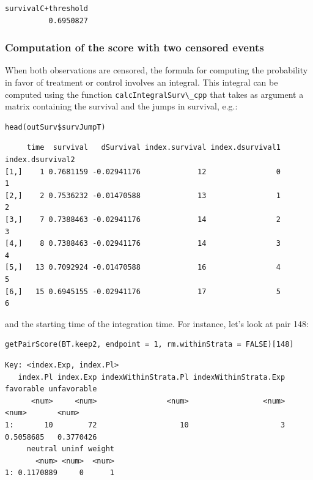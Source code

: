 \documentclass[12pt]{article}
\begin{document}
\begin{verbatim}
survivalC+threshold 
          0.6950827
\end{verbatim}

\subsubsection{Computation of the score with two censored events}
\label{sec:orgd220078}

When both observations are censored, the formula for computing the
probability in favor of treatment or control involves an
integral. This integral can be computed using the function
\texttt{calcIntegralSurv\textbackslash{}\_cpp} that takes as argument a matrix containing the
survival and the jumps in survival, e.g.:
\lstset{language=r,label= ,caption= ,captionpos=b,numbers=none}
\begin{lstlisting}
head(outSurv$survJumpT)
\end{lstlisting}

\begin{verbatim}
     time  survival   dSurvival index.survival index.dsurvival1 index.dsurvival2
[1,]    1 0.7681159 -0.02941176             12                0                1
[2,]    2 0.7536232 -0.01470588             13                1                2
[3,]    7 0.7388463 -0.02941176             14                2                3
[4,]    8 0.7388463 -0.02941176             14                3                4
[5,]   13 0.7092924 -0.01470588             16                4                5
[6,]   15 0.6945155 -0.02941176             17                5                6
\end{verbatim}


and the starting time of the integration time. For instance, let's
look at pair 148:
\lstset{language=r,label= ,caption= ,captionpos=b,numbers=none}
\begin{lstlisting}
getPairScore(BT.keep2, endpoint = 1, rm.withinStrata = FALSE)[148]
\end{lstlisting}

\begin{verbatim}
Key: <index.Exp, index.Pl>
   index.Pl index.Exp indexWithinStrata.Pl indexWithinStrata.Exp favorable unfavorable
      <num>     <num>                <num>                 <num>     <num>       <num>
1:       10        72                   10                     3 0.5058685   0.3770426
     neutral uninf weight
       <num> <num>  <num>
1: 0.1170889     0      1
\end{verbatim}
\end{document}

